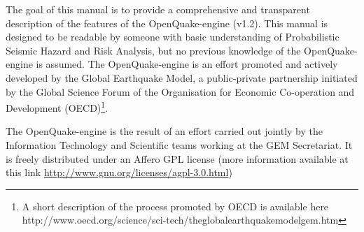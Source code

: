 The goal of this manual is to provide a comprehensive and transparent description
of the features of the OpenQuake-engine (v1.2). This manual is designed to be 
readable by someone with basic understanding of Probabilistic Seismic Hazard 
and Risk Analysis, but no previous knowledge of the OpenQuake-engine is assumed.
%
The OpenQuake-engine is an effort promoted and actively developed by the
Global Earthquake Model, a public-private partnership initiated by the Global
Science Forum of the Organisation for Economic Co-operation and Development 
(OECD)\footnote{A short description of the process promoted by OECD is available 
here http://www.oecd.org/science/sci-tech/theglobalearthquakemodelgem.htm}.

The OpenQuake-engine is the result of an effort carried out jointly by the
Information Technology and Scientific teams working at the GEM Secretariat. 
It is freely distributed under an Affero GPL license 
(more information available at this link 
\href{http://www.gnu.org/licenses/agpl-3.0.html}{http://www.gnu.org/licenses/agpl-3.0.html})
